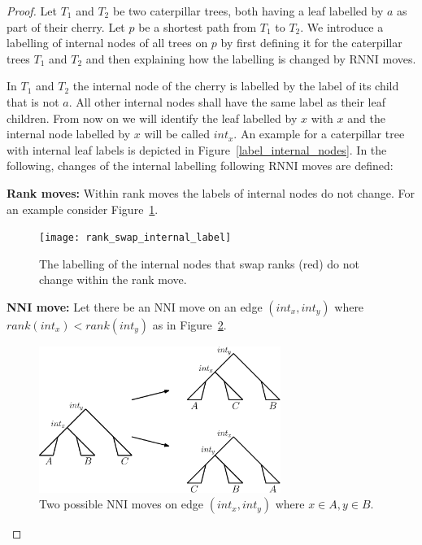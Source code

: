 \documentclass[11pt, a4paper]{article}
\newcommand{\nni}{\mathrm{NNI}}
\newcommand{\rnni}{\mathrm{RNNI}}
\begin{document}
\begin{proof}
	Let $T_1$ and $T_2$ be two caterpillar trees, both having a leaf labelled by $a$ as part of their cherry.
	Let $p$ be a shortest path from $T_1$ to $T_2$.
	We introduce a labelling of internal nodes of all trees on $p$ by first defining it for the caterpillar trees $T_1$ and $T_2$ and then explaining how the labelling is changed by $\rnni$ moves.

	In $T_1$ and $T_2$ the internal node of the cherry is labelled by the label of its child that is not $a$.
	All other internal nodes shall have the same label as their leaf children.
	From now on we will identify the leaf labelled by $x$ with $x$ and the internal node labelled by $x$ will be called $int_x$.
	An example for a caterpillar tree with internal leaf labels is depicted in Figure~\ref{label_internal_nodes}.
	In the following, changes of the internal labelling following $\rnni$ moves are defined:

	\textbf{Rank moves:}
	Within rank moves the labels of internal nodes do not change.
	For an example consider Figure~\ref{fig:rank_swap_internal_label}.

	\begin{figure}[H]
		\centering
		\texttt{[image: rank\_swap\_internal\_label]}
		\caption{The labelling of the internal nodes that swap ranks (red) do not change within the rank move.
		}
		\label{fig:rank_swap_internal_label}
	\end{figure}

	\textbf{NNI move:}
	Let there be an $\nni$ move on an edge $(int_x, int_y)$ where $rank(int_x) < rank(int_y)$ as in Figure~\ref{fig:nni_moves}.

	\begin{figure}[H]
		\centering
		\includegraphics[width=0.7\textwidth]{nni_moves_internal_label}
		\caption{Two possible $\nni$ moves on edge $(int_x, int_y)$ where $x \in A, y \in B$.
		}
		\label{fig:nni_moves}
	\end{figure}


\end{proof}
\end{document}
